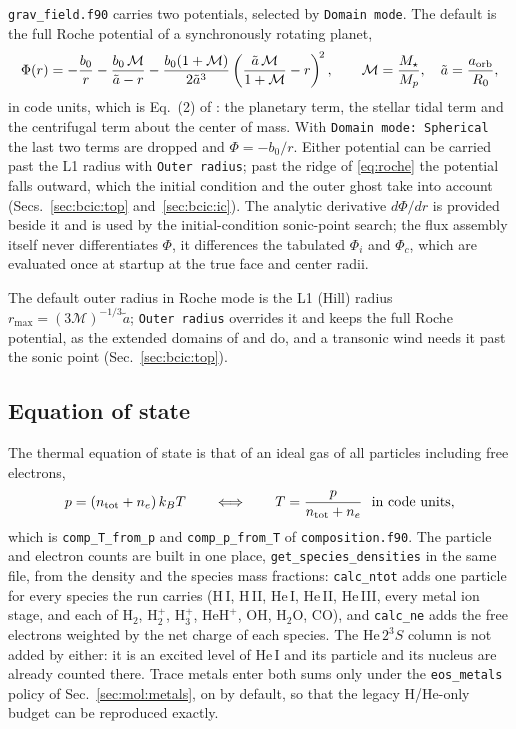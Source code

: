 \texttt{grav\_field.f90} carries two potentials, selected by
\texttt{Domain mode}.  The default is the full Roche potential of a
synchronously rotating planet,
%
\begin{equation}
  \Phi(r) = -\frac{b_0}{r}
            - \frac{b_0\,\mathcal{M}}{\tilde a - r}
            - \frac{b_0(1+\mathcal{M})}{2\tilde a^{3}}
              \left(\frac{\tilde a\,\mathcal{M}}{1+\mathcal{M}} - r\right)^{\!2},
  \qquad \mathcal{M} = \frac{M_\star}{M_p},\quad
  \tilde a = \frac{a_{\rm orb}}{R_0},
  \label{eq:roche}
\end{equation}
%
in code units, which is Eq.~(2) of \citet{Caldiroli2021}:
the planetary term, the stellar tidal term and the centrifugal term about the
center of mass.  With \texttt{Domain mode: Spherical} the last two terms are
dropped and $\Phi = -b_0/r$.  Either potential can be carried past the L1
radius with \texttt{Outer radius}; past the ridge of \eqref{eq:roche} the
potential falls outward, which the initial condition and the outer ghost
take into account (Secs.~\ref{sec:bcic:top} and~\ref{sec:bcic:ic}).  The analytic derivative $d\Phi/dr$ is provided beside it
and is used by the initial-condition sonic-point search; the flux assembly
itself never differentiates $\Phi$, it differences the tabulated $\Phi_i$ and
$\Phi_c$, which are evaluated once at startup at the true face and center
radii.

The default outer radius in Roche mode is the L1 (Hill) radius
$r_{\max} = (3\mathcal{M})^{-1/3}\tilde a$; \texttt{Outer radius} overrides
it and keeps the full Roche potential, as the extended domains of
\citet{Huang2023} and \citet{Yan2022} do, and a transonic wind needs it
past the sonic point (Sec.~\ref{sec:bcic:top}).

\subsection{Equation of state}
\label{sec:hydro:eos}

The thermal equation of state is that of an ideal gas of all particles
including free electrons,
%
\begin{equation}
  p = (n_{\rm tot} + n_e)\,k_B T
  \qquad\Longleftrightarrow\qquad
  T = \frac{p}{n_{\rm tot} + n_e}\ \ \text{in code units},
  \label{eq:thermal_eos}
\end{equation}
%
which is \texttt{comp\_T\_from\_p} and \texttt{comp\_p\_from\_T} of
\texttt{composition.f90}.  The particle and electron counts are built in one
place, \texttt{get\_species\_densities} in the same file, from the density and
the species mass fractions: \texttt{calc\_ntot} adds one particle for every
species the run carries (H\,I, H\,II, He\,I, He\,II, He\,III, every metal ion
stage, and each of $\mathrm{H}_2$, $\mathrm{H}_2^+$, $\mathrm{H}_3^+$,
$\mathrm{HeH}^+$, OH, $\mathrm{H_2O}$, CO), and \texttt{calc\_ne} adds the
free electrons weighted by the net charge of each species.  The
$\mathrm{He}\,2^3S$ column is not added by either: it is an excited level of
He\,I and its particle and its nucleus are already counted there.  Trace
metals enter both sums only under the \texttt{eos\_metals} policy of
Sec.~\ref{sec:mol:metals}, on by default, so that the legacy H/He-only budget
can be reproduced exactly.

